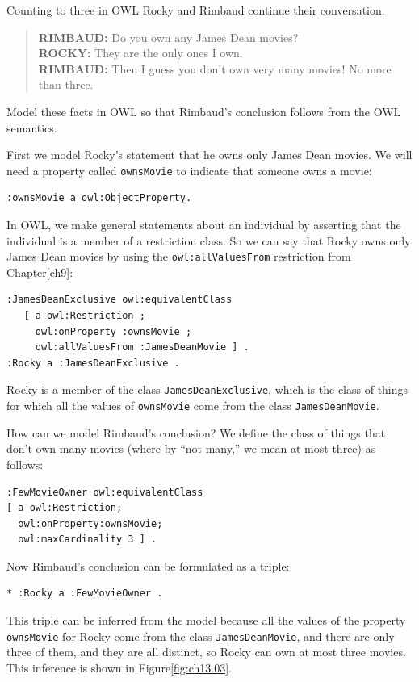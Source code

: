 \begin{challenge}{Counting to three in OWL}
\label{chal:count3}
Rocky and Rimbaud continue their conversation.

\begin{quote}
\textbf{RIMBAUD:} Do you own any James Dean movies? \\
\textbf{ROCKY:} They are the only ones I own. \\
\textbf{RIMBAUD:} Then I guess you don't own very many movies! No more than three.\\
\end{quote}

Model these facts in OWL so that Rimbaud's conclusion follows from the
OWL semantics.

\solution

First we model Rocky's statement that he owns only James Dean movies. We
will need a property called
\texttt{ownsMovie} to indicate that someone owns a movie:

\begin{lstlisting}
:ownsMovie a owl:ObjectProperty.
\end{lstlisting}

In OWL, we make general statements about an individual by asserting that
the individual is a member of a restriction class. So we can say that
Rocky owns only James Dean movies by using the \texttt{owl:allValuesFrom}
restriction from Chapter\ref{ch9}:

\begin{lstlisting}
:JamesDeanExclusive owl:equivalentClass
   [ a owl:Restriction ;
     owl:onProperty :ownsMovie ;
     owl:allValuesFrom :JamesDeanMovie ] .
:Rocky a :JamesDeanExclusive .
\end{lstlisting}

Rocky is a member of the class \texttt{JamesDeanExclusive}, which is the class of
things for which all the values of \texttt{ownsMovie} come from the class
\texttt{JamesDeanMovie}.

How can we model Rimbaud's conclusion? We define the class of things
that don't own many movies (where by
``not many,'' we mean at most three) as follows:

\begin{lstlisting}
:FewMovieOwner owl:equivalentClass
[ a owl:Restriction; 
  owl:onProperty:ownsMovie;
  owl:maxCardinality 3 ] .
\end{lstlisting}

Now Rimbaud's conclusion can be formulated as a triple:

\begin{lstlisting}
* :Rocky a :FewMovieOwner .
\end{lstlisting}

This triple can be inferred from the model because all the values of the
property \texttt{ownsMovie} for Rocky come from the class \texttt{JamesDeanMovie}, and
there are only three of them, and they are all distinct, so Rocky can
own at most three movies. This inference is shown in Figure\ref{fig:ch13.03}.

\end{challenge}
